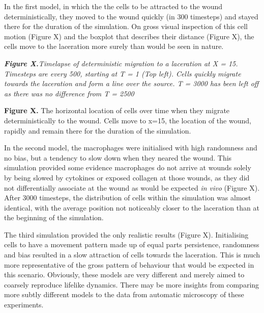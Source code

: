 \documentclass[11.5pt]{article}
\begin{document}
In the first model, in which the the cells to be attracted to the wound 
deterministically, they moved to the wound quickly (in 300 timesteps) 
and stayed there for the duration of the simulation. On gross visual 
inspection of this cell motion (Figure X) and the boxplot that describes 
their distance (Figure X), the cells move to the laceration more surely 
than would be seen in nature.



\begin{figure}[H]
\centering
\end{figure}


{\bfseries {\itshape Figure X.}}{\itshape  Timelapse of deterministic 
migration to a laceration at X = 15. Timesteps are every 500, starting 
at T = 1 (Top left). Cells quickly migrate towards the laceration and 
form a line over the source. T = 3000 has been left off as there was no 
difference from T = 2500}



\begin{figure}[H]
\centering
\end{figure}


{\bfseries Figure X.} The horizontal location of cells over time when 
they migrate deterministically to the wound. Cells move to x=15, the 
location of the wound, rapidly and remain there for the duration of the 
simulation.



In the second model, the macrophages were initialised with high 
randomness and no bias, but a tendency to slow down when they neared the 
wound. This simulation provided some evidence macrophages do not arrive 
at wounds solely by being slowed by cytokines or exposed collagen at 
those wounds, as they did not differentially associate at the wound as 
would be expected {\itshape in vivo} (Figure X). After 3000 timesteps, 
the distribution of cells within the simulation was almost identical, 
with the average position not noticeably closer to the laceration than 
at the beginning of the simulation.\begin{figure}[H]
\centering
\end{figure}


The third simulation provided the only realistic results (Figure X). 
Initialising cells to have a movement pattern made up of equal parts 
persistence, randomness and bias resulted in a slow attraction of cells 
towards the laceration. This is much more representative of the gross 
pattern of behaviour that would be expected in this scenario. Obviously, 
these models are very different and merely aimed to coarsely reproduce 
lifelike dynamics. There may be more insights from comparing more subtly 
different models to the data from automatic microscopy of these 
experiments.
\end{document}
